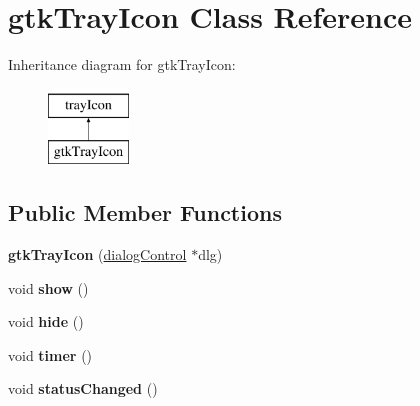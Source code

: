 \hypertarget{classgtkTrayIcon}{\section{gtk\-Tray\-Icon \-Class \-Reference}
\label{classgtkTrayIcon}
}
\-Inheritance diagram for gtk\-Tray\-Icon\-:\begin{figure}[H]
\begin{center}
\leavevmode
\includegraphics[height=2.000000cm]{classgtkTrayIcon}
\end{center}
\end{figure}
\subsection*{\-Public \-Member \-Functions}
\begin{DoxyCompactItemize}
\item 
\hypertarget{classgtkTrayIcon_ad46b726e2cf59f14061d73cdd46e826e}{{\bfseries gtk\-Tray\-Icon} (\hyperlink{classdialogControl}{dialog\-Control} $\ast$dlg)}\label{classgtkTrayIcon_ad46b726e2cf59f14061d73cdd46e826e}

\item 
\hypertarget{classgtkTrayIcon_aa635637a856709568ae6855e46ad7674}{void {\bfseries show} ()}\label{classgtkTrayIcon_aa635637a856709568ae6855e46ad7674}

\item 
\hypertarget{classgtkTrayIcon_a7f486beca0deb1dd2be9145c345c0b17}{void {\bfseries hide} ()}\label{classgtkTrayIcon_a7f486beca0deb1dd2be9145c345c0b17}

\item 
\hypertarget{classgtkTrayIcon_a4fc6656f6a52335fd04938894b8fae0a}{void {\bfseries timer} ()}\label{classgtkTrayIcon_a4fc6656f6a52335fd04938894b8fae0a}

\item 
\hypertarget{classgtkTrayIcon_aac64b1529194de9c2a79b40a907a9d6b}{void {\bfseries status\-Changed} ()}\label{classgtkTrayIcon_aac64b1529194de9c2a79b40a907a9d6b}

\end{DoxyCompactItemize}
